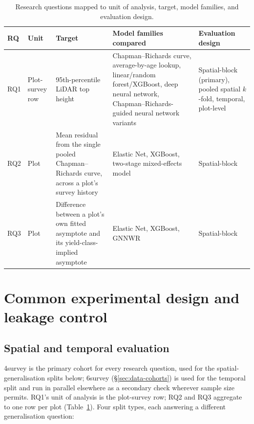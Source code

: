\documentclass[11pt,a4paper]{report}
\begin{document}
\begin{table}[!htbp]
\centering
\scriptsize
\renewcommand{\arraystretch}{1.2}
\begin{tabular}{p{0.8cm}p{1.4cm}p{3.3cm}p{4.2cm}p{2.9cm}}
\toprule
RQ & Unit & Target & Model families compared & Evaluation design \\
\midrule
RQ1 & Plot-survey row & 95th-percentile LiDAR top height & Chapman--Richards curve, average-by-age
lookup, linear/random forest/XGBoost, deep neural network, Chapman--Richards-guided neural network
variants & Spatial-block (primary), pooled spatial $k$-fold, temporal, plot-level \\
RQ2 & Plot & Mean residual from the single pooled Chapman--Richards curve, across a plot's survey
history & Elastic Net, XGBoost, two-stage mixed-effects model & Spatial-block \\
RQ3 & Plot & Difference between a plot's own fitted asymptote and its yield-class-implied
asymptote & Elastic Net, XGBoost, GNNWR & Spatial-block \\
\bottomrule
\end{tabular}
\caption{Research questions mapped to unit of analysis, target, model families, and evaluation
design.}
\label{tab:rq-framework}
\end{table}

\section{Common experimental design and leakage control}

\subsection{Spatial and temporal evaluation}

4survey is the primary cohort for every research question, used for the spatial-generalisation
splits below; 6survey (\S\ref{sec:data-cohorts}) is used for the temporal split and run in
parallel elsewhere as a secondary check wherever sample size permits. RQ1's unit of analysis is
the plot-survey row; RQ2 and RQ3 aggregate to one row per plot (Table~\ref{tab:rq-framework}).
Four split types, each answering a different generalisation question:
\end{document}
